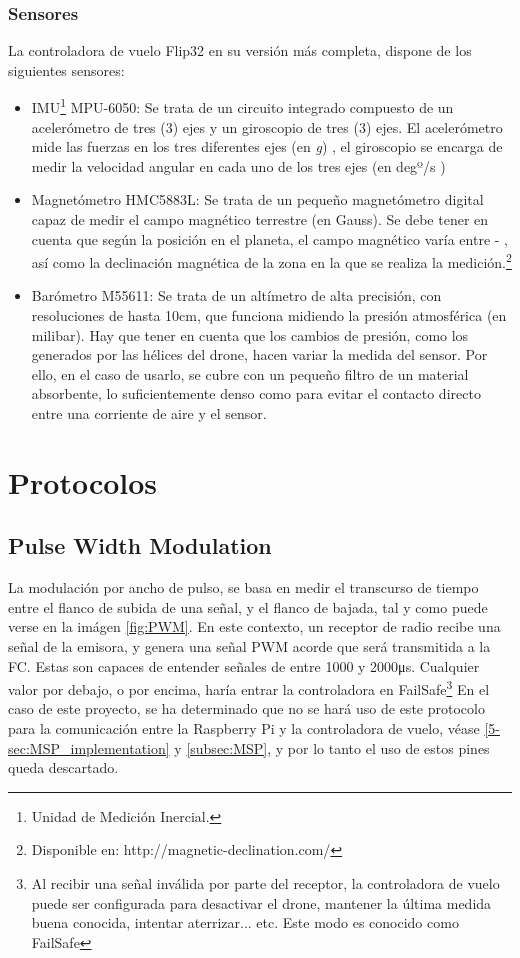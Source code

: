 \newpage
\subsubsection{Sensores}
La controladora de vuelo Flip32 en su versión más completa, dispone de los siguientes sensores:
\begin{itemize}
\item IMU\footnote{Unidad de Medición Inercial.} MPU-6050: Se trata de un circuito integrado compuesto de un acelerómetro de tres (3) ejes y un giroscopio de tres (3) ejes. El acelerómetro mide las fuerzas en los tres diferentes ejes (en \textit{g}) , el giroscopio se encarga de medir la velocidad angular en cada uno de los tres ejes (en degº/s )
\item Magnetómetro HMC5883L: Se trata de un pequeño magnetómetro digital capaz de medir el campo magnético terrestre (en Gauss). Se debe tener en cuenta que según la posición en el planeta, el campo magnético varía entre \si{} - \si{}, así como la declinación magnética de la zona en la que se realiza la medición.\footnote{Disponible en: http://magnetic-declination.com/}
\item Barómetro M55611: Se trata de un altímetro de alta precisión, con resoluciones de hasta 10cm, que funciona midiendo la presión atmosférica (en milibar). Hay que tener en cuenta que los cambios de presión, como los generados por las hélices del drone, hacen variar la medida del sensor. Por ello, en el caso de usarlo, se cubre con un pequeño filtro de un material absorbente, lo suficientemente denso como para evitar el contacto directo entre una corriente de aire y el sensor.
\end{itemize}
\newpage
\section{Protocolos}

\subsection{Pulse Width Modulation}
\label{subsec:PWM}



La modulación por ancho de pulso, se basa en medir el transcurso de tiempo entre el flanco de subida de una señal, y el flanco de bajada, tal y como puede verse en la imágen \ref{fig:PWM}.
En este contexto, un receptor de radio recibe una señal de la emisora,  y genera una señal PWM acorde que será transmitida a la FC.
Estas son capaces de entender señales de entre 1000 y 2000\si{\us}. Cualquier valor por debajo, o por encima, haría entrar la controladora en FailSafe\footnote{Al recibir una señal inválida por parte del receptor, la controladora de vuelo puede ser configurada para desactivar el drone, mantener la última medida buena conocida, intentar aterrizar... etc. Este modo es conocido como FailSafe}
En el caso de este proyecto, se ha determinado que no se hará uso de este protocolo para la comunicación entre la Raspberry Pi y la controladora de vuelo, véase \ref{5-sec:MSP_implementation} y \ref{subsec:MSP}, y por lo tanto el uso de estos pines queda descartado.

